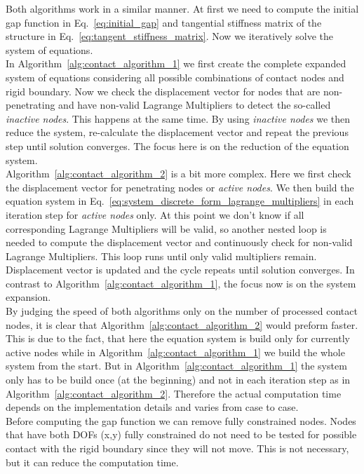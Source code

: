 \documentclass[10pt,a4paper]{article}
\begin{document}
Both algorithms work in a similar manner. At first we need to compute the initial gap function in Eq.~\eqref{eq:initial_gap} and tangential stiffness matrix of the structure in Eq.~\eqref{eq:tangent_stiffness_matrix}. Now we iteratively solve the system of equations. \\

In Algorithm~\ref{alg:contact_algorithm_1} we first create the complete expanded system of equations considering all possible combinations of contact nodes and rigid boundary. Now we check the displacement vector for nodes that are non-penetrating and have non-valid Lagrange Multipliers to detect the so-called \textit{inactive nodes}. This happens at the same time. By using \textit{inactive nodes} we then reduce the system, re-calculate the displacement vector and repeat the previous step until solution converges. The focus here is on the reduction of the equation system.  \\

Algorithm~\ref{alg:contact_algorithm_2} is a bit more complex. Here we first check the displacement vector for penetrating nodes or \textit{active nodes}. We then build the equation system in Eq.~\eqref{eq:system_discrete_form_lagrange_multipliers} in each iteration step for \textit{active nodes} only. At this point we don't know if all corresponding Lagrange Multipliers will be valid, so another nested loop is needed to compute the displacement vector and continuously check for non-valid Lagrange Multipliers. This loop runs until only valid multipliers remain. Displacement vector is updated and the cycle repeats until solution converges. In contrast to Algorithm~\ref{alg:contact_algorithm_1}, the focus now is on the system expansion. \\

By judging the speed of both algorithms only on the number of processed contact nodes, it is clear that Algorithm~\ref{alg:contact_algorithm_2} would preform faster. This is due to the fact, that here the equation system is build only for currently active nodes while in Algorithm~\ref{alg:contact_algorithm_1} we build the whole system from the start. But in Algorithm~\ref{alg:contact_algorithm_1} the system only has to be build once (at the beginning) and not in each iteration step as in Algorithm~\ref{alg:contact_algorithm_2}. Therefore the actual computation time depends on the implementation details and varies from case to case. \\

Before computing the gap function we can remove fully constrained nodes. Nodes that have both DOFs (x,y) fully constrained do not need to be tested for possible contact with the rigid boundary since they will not move. This is not necessary, but it can reduce the computation time. 
\end{document}
